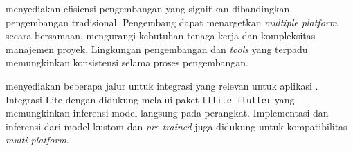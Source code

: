 

\flutter{} menyediakan efisiensi pengembangan yang signifikan dibandingkan pengembangan tradisional. Pengembang dapat menargetkan \emph{multiple platform} secara bersamaan, mengurangi kebutuhan tenaga kerja dan kompleksitas manajemen proyek. Lingkungan pengembangan dan \emph{tools} yang terpadu memungkinkan konsistensi selama proses pengembangan.



\flutter{} menyediakan beberapa jalur untuk integrasi \ml{} yang relevan untuk aplikasi \cv{}. Integrasi \tensorflow Lite dengan \flutter{} didukung melalui paket \texttt{tflite\_flutter} yang memungkinkan inferensi model langsung pada perangkat. Implementasi dan inferensi dari model kustom dan \emph{pre-trained} juga didukung untuk kompatibilitas \emph{multi-platform}.

